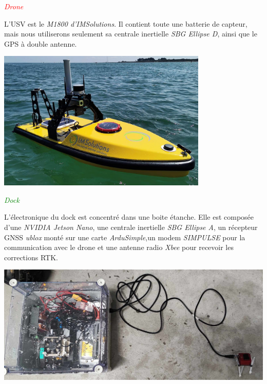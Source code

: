 \documentclass[portrait,final,a0paper,fontscale=0.3]{baposter}
\begin{document}
\begin{poster}
{	\begin{minipage}[t]{0.30\textwidth}
		\vspace{-0.1cm}
		\begin{center}
			\large\textcolor{red}{\emph{Drone}}
		\end{center}
		\small\vspace{-0.2cm}
		L'USV est le \textit{M1800 d'IMSolutions}. Il contient toute une batterie de capteur,
		mais nous utiliserons seulement sa centrale inertielle \textit{SBG Ellipse D}, ainsi
		que le GPS à double antenne.
		\begin{center}
			\includegraphics*[width=0.75\textwidth]{monodrone-1800-chenal.jpg}
		\end{center}
	\end{minipage}\hfill
	\begin{minipage}[t]{0.30\textwidth}
		\vspace{-0.1cm}
		\begin{center}
			\large\textcolor{green}{\emph{Dock}}
		\end{center}
		\small\vspace{-0.2cm}
		L'électronique du dock est concentré dans une boite étanche. Elle est composée d'une \textit{NVIDIA
		Jetson Nano}, une centrale inertielle \textit{SBG Ellipse A}, un récepteur GNSS \textit{ublox} monté
		sur une carte \textit{ArduSimple},un modem \textit{SIMPULSE} pour la communication avec le drone
		et une antenne radio \textit{Xbee} pour recevoir les corrections RTK.
		\begin{center}
			\includegraphics*[height=0.8\textwidth,angle=90]{dock_box_outside.jpg}

\end{center}
\end{minipage}}
\end{poster}
\end{document}
